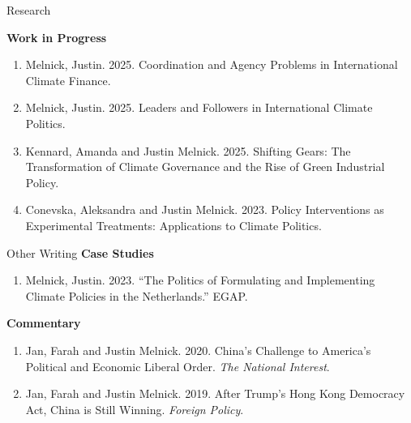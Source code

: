 \documentclass{resume} %
\begin{document}
\begin{rSection}{Research}
\begin{enumerate}
\end{enumerate}

\textbf{Work in Progress}
\begin{enumerate}
\item Melnick, Justin. 2025. Coordination and Agency Problems in International Climate Finance.
\item Melnick, Justin. 2025. Leaders and Followers in International Climate Politics.
\item Kennard, Amanda and Justin Melnick. 2025. Shifting Gears: The Transformation of Climate Governance and the Rise of Green Industrial Policy.
    \item Conevska, Aleksandra and Justin Melnick. 2023. Policy Interventions as Experimental Treatments: Applications to Climate Politics.
\end{enumerate}

\end{rSection}

\newpage

\begin{rSection}{Other Writing}
\textbf{Case Studies}
\begin{enumerate}
\item Melnick, Justin. 2023. ``The Politics of Formulating and Implementing Climate Policies in the Netherlands.'' EGAP.
\end{enumerate}

\textbf{Commentary}
    \begin{enumerate}
    \item   Jan, Farah and Justin Melnick. 2020. China's Challenge to America's Political and Economic Liberal Order. \textit{The National Interest}.
    \item    Jan, Farah and Justin Melnick. 2019. After Trump's Hong Kong Democracy Act, China is Still Winning. \textit{Foreign Policy}.
\end{enumerate}
\end{rSection}
\end{document}
